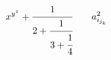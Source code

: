 \documentclass{article}
\begin{document}
\[
x^{y^{z}} + \cfrac{1}{2+\cfrac{1}{3+\cfrac{1}{4}}}
\qquad
a_{i_{j_{k}}}^{2}
\]
\end{document}
